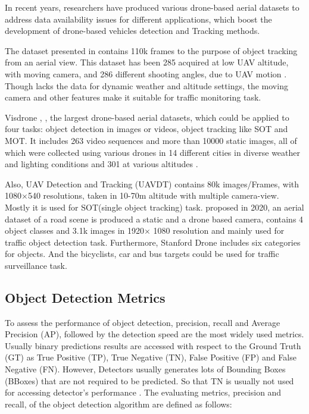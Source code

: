 \documentclass[10pt,twocolumn,letterpaper]{article}  %
\begin{document}
In recent years, researchers have produced various drone-based aerial datasets to address data availability issues for different applications, which boost the development of drone-based vehicles detection and Tracking methods.\cite{bisio2022systematic}

The dataset presented in \cite{mueller2016benchmark} contains 110k frames to the purpose of object tracking from an aerial view. This dataset has been 285
acquired at low UAV altitude, with moving camera, and 286
different shooting angles, due to UAV motion \cite{bisio2022systematic}. Though \cite{mueller2016benchmark} lacks the data for dynamic weather and altitude settings, the moving camera and other features make it suitable for traffic monitoring task.

Visdrone \cite{zhu2021detection}, \cite{zhu2018vision}, the largest drone-based aerial datasets, which could be applied to four tasks: object detection in images or videos, object tracking like SOT and MOT. It includes 263 video sequences and more than 10000 static images, all of which were collected using various drones in 14 different cities in diverse weather and lighting conditions and 301
at various altitudes \cite{bisio2022systematic}.

Also, UAV Detection and Tracking (UAVDT) \cite{du2018unmanned} contains 80k images/Frames, with 1080$\times$540  resolutions, taken in 10-70m altitude with multiple camera-view. Mostly it is used for SOT(single object tracking) task. \cite{jensen2020presenting} proposed in 2020, an aerial dataset of a road scene is produced a static and a drone based camera, contains 4 object classes and 3.1k images in 1920$\times$ 1080 resolution and mainly used for traffic object detection task. Furthermore, Stanford Drone \cite{robicquet2016learning} includes six categories for objects. And the bicyclists, car and bus targets could be used for traffic surveillance task. 

\subsection{Object Detection Metrics}
To assess the performance of object detection, precision, recall and Average Precision (AP), followed by the detection speed are the most widely used metrics. Usually binary predictions results are accessed with respect to the Ground Truth (GT) as True Positive (TP), True Negative (TN), False Positive (FP) and False Negative (FN). However, Detectors usually generates lots of Bounding Boxes (BBoxes) that are not required to be predicted. So that TN is usually not used for accessing detector's performance \cite{padilla2020survey}.
The evaluating metrics, precision and recall, of the object detection algorithm are defined as follows:
\end{document}
